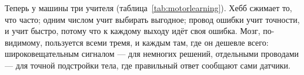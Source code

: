 Теперь у машины три учителя (таблица~\ref{tab:motorlearning}). Хебб сжимает то, что часто;  одним числом учит выбирать выгодное; провод ошибки учит точности, и учит быстро, потому что к каждому выходу идёт своя ошибка. Мозг, по-видимому, пользуется всеми тремя, и каждым там, где он дешевле всего: широковещательным сигналом --- для немногих решений, отдельными проводами --- для точной подстройки тела, где правильный ответ сообщают сами датчики.
